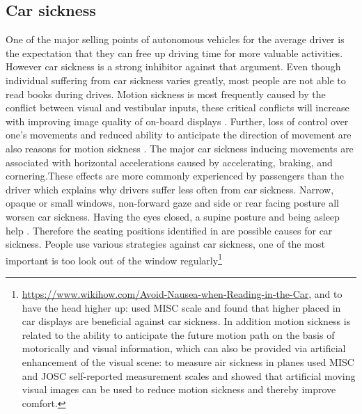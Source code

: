 \subsection{Car sickness}
\label{ssec:carsickness}
One of the major selling points of autonomous vehicles for the average driver is the expectation that they can free up driving time for more valuable activities. However car sickness is a strong inhibitor against that argument. Even though individual suffering from car sickness varies greatly, most people are not able to read books during drives. Motion sickness is most frequently caused by the conflict between visual and vestibular inputs, these critical conflicts will increase with improving image quality of on-board displays \cite{Diels2016}. Further, loss of control over one’s movements and reduced ability to anticipate the direction of movement are also reasons for motion sickness \cite{Sivak2015}. The major car sickness inducing movements are associated with horizontal accelerations caused by accelerating, braking, and cornering\cite{Diels2016}.These effects are more commonly experienced by passengers than the driver which explains why drivers suffer less often from car sickness. Narrow, opaque or small windows, non-forward gaze and side or rear facing posture all worsen car sickness. Having the eyes closed, a supine posture and being asleep help \cite{Sivak2015}. Therefore the seating positions identified in  are possible causes for car sickness. People use various strategies against car sickness, one of the most important is too look out of the window regularly\footnote{\url{https://www.wikihow.com/Avoid-Nausea-when-Reading-in-the-Car}, and to have the head higher up: \cite{Kuiper2018LookingCarsickness} used MISC scale and found that higher placed in car displays are beneficial against car sickness. In addition motion sickness is related to the ability to anticipate the future motion path on the basis of motorically and visual information, which can also be provided via artificial enhancement of the visual scene: to measure air sickness in planes \cite{Feenstra2011AAirsickness} used MISC and JOSC self-reported measurement scales and showed that artificial moving visual images can be used to reduce motion sickness and thereby improve comfort.

}
